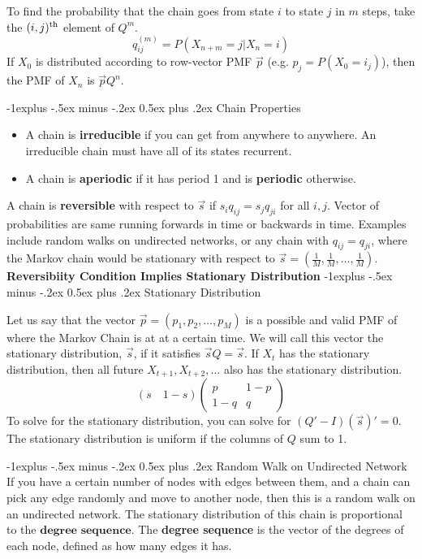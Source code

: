 \documentclass[10pt,landscape]{article}
\makeatletter
\theoremstyle{definition}
\renewcommand{\subsection}{\@startsection{subsection}{2}{0mm}%
                                {-1explus -.5ex minus -.2ex}%
                                {0.5ex plus .2ex}%
                                {\normalfont\normalsize\bfseries}}
\makeatother
\begin{document}
\begin{multicols}{3}
To find the probability that the chain goes from state $i$ to state $j$ in $m$ steps, take the $(i, j)^\textnormal{th}$ element of $Q^m$.
\[q^{(m)}_{ij} = P(X_{n+m} = j | X_n = i)\]
If $X_0$ is distributed according to row-vector PMF $\vec{p}$ (e.g. $p_j = P(X_0 = i_j)$), then the PMF of $X_n$ is $\vec{p}Q^n$.



\subsection{Chain Properties}
 
\begin{itemize}
\item A chain is \textbf{irreducible} if you can get from anywhere to anywhere. An irreducible chain must have all of its states recurrent. 
\item A chain is \textbf{aperiodic} if it has period 1 and is \textbf{periodic} otherwise. 
\end{itemize}
A chain is \textbf{reversible} with respect to $\vec{s}$ if $s_iq_{ij} = s_jq_{ji}$ for all $i, j$.  Vector of probabilities are same running forwards in time or backwards in time. Examples include random walks on undirected networks, or any chain with $q_{ij} = q_{ji}$, where the Markov chain would be stationary with respect to $\vec{s} = (\frac{1}{M}, \frac{1}{M}, \dots, \frac{1}{M})$. \\
\textbf{Reversibiity Condition Implies Stationary Distribution} 
\subsection{Stationary Distribution}


Let us say that the vector $\vec{p} = (p_1, p_2, \dots, p_M)$ is a possible and valid PMF of where the Markov Chain is at at a certain time. We will call this vector the stationary distribution, $\vec{s}$, if it satisfies $\vec{s}Q = \vec{s}$. If $X_t$ has the stationary distribution, then all future $X_{t+1}, X_{t + 2}, \dots$ also has the stationary distribution. \\
\[(s \quad 1-s)\left( \begin{array}{cc}
p & 1-p \\
1-q & q \end{array} \right)\] To solve for the stationary distribution, you can solve for $(Q' - I)(\vec{s})' = 0$. The stationary distribution is uniform if the columns of $Q$ sum to 1.


\subsection{Random Walk on Undirected Network}
If you have a certain number of nodes with edges between them, and a chain can pick any edge randomly and move to another node, then this is a random walk on an undirected network. The stationary distribution of this chain is proportional to the $\textbf{degree sequence}.$ The \textbf{degree sequence} is the vector of the degrees of each node, defined as how many edges it has.




\end{multicols}
\end{document}
